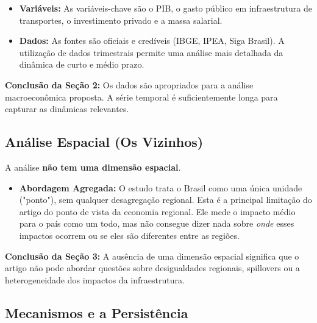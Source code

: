 \documentclass[12pt, a4paper]{article}
\begin{document}
\begin{itemize}
    \item \textbf{Variáveis:} As variáveis-chave são o PIB, o gasto público em infraestrutura de transportes, o investimento privado e a massa salarial.
    \item \textbf{Dados:} As fontes são oficiais e credíveis (IBGE, IPEA, Siga Brasil). A utilização de dados trimestrais permite uma análise mais detalhada da dinâmica de curto e médio prazo.
\end{itemize}

\noindent\textbf{Conclusão da Seção 2:} Os dados são apropriados para a análise macroeconômica proposta. A série temporal é suficientemente longa para capturar as dinâmicas relevantes.

\subsection{Análise Espacial (Os Vizinhos)}
A análise \textbf{não tem uma dimensão espacial}.
\begin{itemize}
    \item \textbf{Abordagem Agregada:} O estudo trata o Brasil como uma única unidade ("ponto"), sem qualquer desagregação regional. Esta é a principal limitação do artigo do ponto de vista da economia regional. Ele mede o impacto médio para o país como um todo, mas não consegue dizer nada sobre \textit{onde} esses impactos ocorrem ou se eles são diferentes entre as regiões.
\end{itemize}

\noindent\textbf{Conclusão da Seção 3:} A ausência de uma dimensão espacial significa que o artigo não pode abordar questões sobre desigualdades regionais, spillovers ou a heterogeneidade dos impactos da infraestrutura.

\subsection{Mecanismos e a Persistência}
\end{document}
